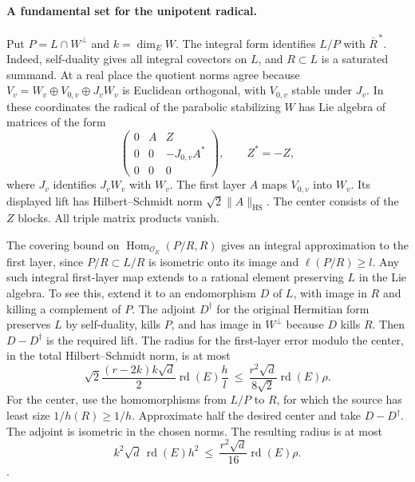 \paragraph{A fundamental set for the unipotent radical.}
Put \(P=L\cap W^\perp\) and \(k=\dim_E W\).
The integral form identifies \(L/P\) with
\(\overline R^{\,*}\). Indeed, self-duality gives all integral
covectors on \(L\), and \(R\subset L\) is a saturated
summand. At a real place the quotient norms agree because
\(V_v=W_v\oplus V_{0,v}\oplus J_vW_v\) is Euclidean
orthogonal, with \(V_{0,v}\) stable under \(J_v\).
In these coordinates the radical of the parabolic
stabilizing \(W\) has Lie algebra of matrices of the form
\[
 \begin{pmatrix}
  0&A&Z\\
  0&0&-J_{0,v}A^*\\
  0&0&0
 \end{pmatrix},
 \qquad Z^*=-Z ,
\]
where \(J_v\) identifies \(J_vW_v\) with \(W_v\).
The first layer \(A\) maps \(V_{0,v}\) into \(W_v\).
Its displayed lift has Hilbert--Schmidt norm
\(\sqrt2\|A\|_{\mathrm{HS}}\). The center consists of
the \(Z\) blocks. All triple matrix products vanish.

The covering bound on
\(\operatorname{Hom}_{\mathcal O_E}(P/R,R)\) gives an
integral approximation to the first layer, since
\(P/R\subset L/R\) is isometric onto its image and
\(\ell(P/R)\ge l\). Any such integral first-layer map
extends to a rational element preserving \(L\) in
the Lie algebra. To see this, extend it to an
endomorphism \(D\) of \(L\), with image in \(R\)
and killing a complement of \(P\). The adjoint
\(D^\dagger\) for the original Hermitian form preserves
\(L\) by self-duality, kills \(P\), and has image in
\(W^\perp\) because \(D\) kills \(R\).
Then \(D-D^\dagger\) is the required lift.
The radius for the first-layer error modulo the center,
in the total Hilbert--Schmidt norm, is at most
\[
 \sqrt2\frac{(r-2k)k\sqrt d}{2}
       \operatorname{rd}(E)\frac h l
 \ \le\ \frac{r^2\sqrt d}{8\sqrt2}\operatorname{rd}(E)\rho.
\]
For the center, use the homomorphisms from \(L/P\) to
\(R\), for which the source has least size
\(1/h(R)\ge1/h\). Approximate half the desired center
and take \(D-D^\dagger\). The adjoint is isometric in
the chosen norms. The resulting radius is at most
\[
 k^2\sqrt d\,\operatorname{rd}(E)h^2
 \ \le\ \frac{r^2\sqrt d}{16}\operatorname{rd}(E)\rho .
\]
.

